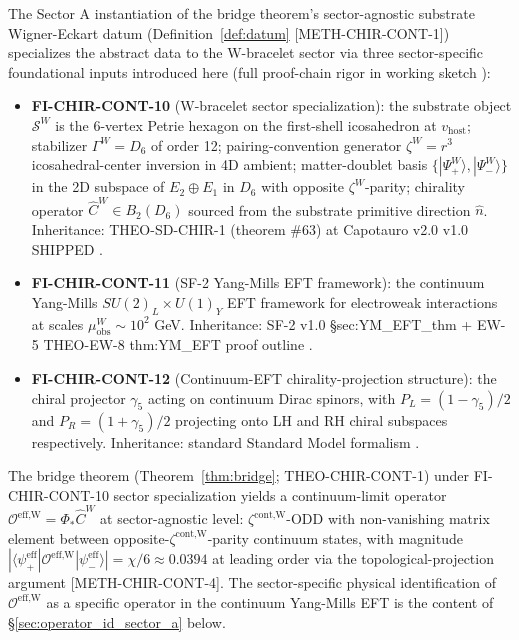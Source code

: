 \documentclass[11pt,letterpaper]{article}
\newcommand{\Dsix}{D_6}
\newcommand{\Phicont}{\Phi_*}
\newcommand{\OeffW}{\mathcal{O}^{\text{eff,W}}}
\newcommand{\muobs}{\mu_{\text{obs}}}
\newcommand{\methref}[1]{\textsf{\small[\textsc{#1}]}}
\begin{document}
The Sector A instantiation of the bridge theorem's sector-agnostic substrate Wigner-Eckart datum (Definition~\ref{def:datum} \methref{METH-CHIR-CONT-1}) specializes the abstract data to the W-bracelet sector via three sector-specific foundational inputs introduced here (full proof-chain rigor in working sketch \cite{ChiContSketchA}):

\begin{itemize}[leftmargin=*]
\item \textbf{FI-CHIR-CONT-10} (W-bracelet sector specialization): the substrate object $\mathcal{S}^W$ is the 6-vertex Petrie hexagon on the first-shell icosahedron at $v_{\text{host}}$; stabilizer $\Gamma^W = \Dsix$ of order 12; pairing-convention generator $\zeta^W = r^3$ icosahedral-center inversion in 4D ambient; matter-doublet basis $\{|\Psi^W_+\rangle, |\Psi^W_-\rangle\}$ in the 2D subspace of $E_2 \oplus E_1$ in $\Dsix$ with opposite $\zeta^W$-parity; chirality operator $\hat{C}^W \in B_2(\Dsix)$ sourced from the substrate primitive direction $\hat{n}$. Inheritance: THEO-SD-CHIR-1 (theorem \#63) at Capotauro v2.0 v1.0 SHIPPED \cite{Capotauro}.

\item \textbf{FI-CHIR-CONT-11} (SF-2 Yang-Mills EFT framework): the continuum Yang-Mills $SU(2)_L \times U(1)_Y$ EFT framework for electroweak interactions at scales $\muobs^W \sim 10^2$ GeV. Inheritance: SF-2 v1.0 §sec:YM\_EFT\_thm \cite{SF2v1} + EW-5 THEO-EW-8 thm:YM\_EFT proof outline \cite{EW5}.

\item \textbf{FI-CHIR-CONT-12} (Continuum-EFT chirality-projection structure): the chiral projector $\gamma_5$ acting on continuum Dirac spinors, with $P_L = (1-\gamma_5)/2$ and $P_R = (1+\gamma_5)/2$ projecting onto LH and RH chiral subspaces respectively. Inheritance: standard Standard Model formalism \cite{Peskin, ChengLi, CommonsBucksbaum}.
\end{itemize}

The bridge theorem (Theorem~\ref{thm:bridge}; THEO-CHIR-CONT-1) under FI-CHIR-CONT-10 sector specialization yields a continuum-limit operator $\OeffW = \Phicont\hat{C}^W$ at sector-agnostic level: $\zeta^{\text{cont,W}}$-ODD with non-vanishing matrix element between opposite-$\zeta^{\text{cont,W}}$-parity continuum states, with magnitude $|\langle\psi^{\text{eff}}_+|\OeffW|\psi^{\text{eff}}_-\rangle| = \chi/6 \approx 0.0394$ at leading order via the topological-projection argument \methref{METH-CHIR-CONT-4}. The sector-specific physical identification of $\OeffW$ as a specific operator in the continuum Yang-Mills EFT is the content of §\ref{sec:operator_id_sector_a} below.
\end{document}
